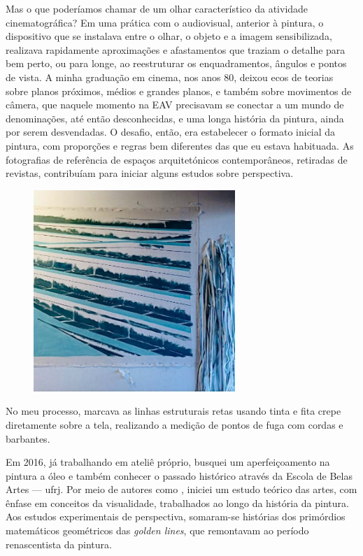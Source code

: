 Mas o que poderíamos chamar de um olhar característico da atividade
cinematográfica? Em uma prática com o audiovisual, anterior à pintura,
o dispositivo que se instalava entre o olhar, o objeto e a imagem
sensibilizada, realizava rapidamente aproximações e afastamentos que
traziam o detalhe para bem perto, ou para longe, ao reestruturar os
enquadramentos, ângulos e pontos de vista. A minha graduação em cinema,
nos anos 80, deixou ecos de teorias sobre planos próximos, médios e
grandes planos, e também sobre movimentos de câmera, que naquele
momento na EAV precisavam se conectar a um mundo de denominações, até
então desconhecidas, e uma longa história da pintura, ainda por serem
desvendadas. O desafio, então, era estabelecer o formato inicial da
pintura, com proporções e regras bem diferentes das que eu estava
habituada. As fotografias de referência de espaços arquitetónicos
contemporâneos, retiradas de revistas, contribuíam para iniciar alguns
estudos sobre perspectiva.

\begin{figure}[h]
  \flushright
  \begin{minipage}{3.45869in}
  \caption{}

	\includegraphics[width=3in]{figuras/odette-processo-pintura-cavea-2014.pdf.compressed.pdf}
\end{minipage}
\end{figure}

No meu processo, marcava as linhas estruturais retas usando tinta e
fita crepe diretamente sobre a tela, realizando a medição de pontos de
fuga com cordas e barbantes.


Em 2016, já trabalhando em ateliê próprio, busquei um aperfeiçoamento
na pintura a óleo e também conhecer o passado histórico através da
Escola de Belas Artes --- \ac{ufrj}. Por meio de autores como
\textcite{wolfflin2000conceitos,argan2010arte,itten1975arte}, iniciei
um estudo teórico das artes, com ênfase em conceitos da visualidade,
trabalhados ao longo da história da pintura. Aos estudos experimentais
de perspectiva, somaram-se histórias dos primórdios matemáticos
geométricos das \emph{golden lines}, que remontavam ao período
renascentista da pintura.\newpage


